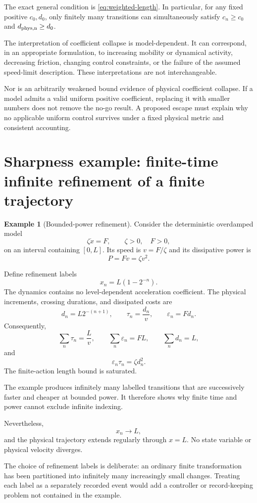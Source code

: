 \documentclass[11pt,a4paper]{article}
\theoremstyle{definition}
\newtheorem{example}[theorem]{Example}
\numberwithin{equation}{section}
\begin{document}
The exact general condition is \eqref{eq:weighted-length}.
In particular, for any fixed positive $c_0,d_0$, only finitely many
transitions can simultaneously satisfy
$c_n\ge c_0$ and $d_{\rm phys,n}\ge d_0$.

The interpretation of coefficient collapse is model-dependent.
It can correspond, in an appropriate formulation, to increasing
mobility or dynamical activity, decreasing friction, changing control
constraints, or the failure of the assumed speed-limit description.
These interpretations are not interchangeable.

Nor is an arbitrarily weakened bound evidence of physical
coefficient collapse. If a model admits a valid uniform positive
coefficient, replacing it with smaller numbers does not remove the
no-go result. A proposed escape must explain why no applicable
uniform control survives under a fixed physical metric and
consistent accounting.


\section{Sharpness example:
finite-time infinite refinement of a finite trajectory}

\begin{example}[Bounded-power refinement]
\label{ex:refinement}
Consider the deterministic overdamped model
\[
\zeta\dot x=F,
\qquad
\zeta>0,\quad F>0,
\]
on an interval containing $[0,L]$. Its speed is
$v=F/\zeta$ and its dissipative power is
\[
P=Fv=\zeta v^2.
\]

Define refinement labels
\[
x_n=L(1-2^{-n}).
\]
The dynamics contains no level-dependent acceleration coefficient.
The physical increments, crossing durations, and dissipated costs are
\[
d_n=L2^{-(n+1)},
\qquad
\tau_n=\frac{d_n}{v},
\qquad
\varepsilon_n=Fd_n.
\]
Consequently,
\[
\sum_n\tau_n=\frac Lv,
\qquad
\sum_n\varepsilon_n=FL,
\qquad
\sum_nd_n=L,
\]
and
\[
\varepsilon_n\tau_n=\zeta d_n^2.
\]
The finite-action length bound is saturated.
\end{example}

The example produces infinitely many labelled transitions that are
successively faster and cheaper at bounded power. It therefore
shows why finite time and power cannot exclude infinite indexing.

Nevertheless,
\[
x_n\to L,
\]
and the physical trajectory extends regularly through $x=L$.
No state variable or physical velocity diverges.

The choice of refinement labels is deliberate: an ordinary finite
transformation has been partitioned into infinitely many increasingly
small changes. Treating each label as a separately recorded event
would add a controller or record-keeping problem not contained in
the example.
\end{document}
